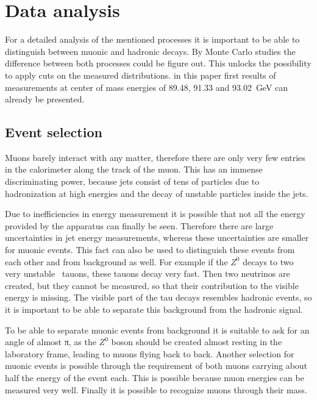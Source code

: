 \documentclass[epj,nopacs]{svjour}
\begin{document}
\section{ Data analysis}

For a detailed analysis of the mentioned processes it is important to be able
to distinguish between muonic and hadronic decays. By Monte Carlo studies the
difference between both processes could be figure out. This unlocks the
possibility to apply cuts on the measured distributions. in this paper first
results of measurements at center of mass energies of \num{89.48}, \num{91.33} and
\SI{93.02}{\giga\electronvolt} can already be presented.

\subsection{ Event selection}
Muons barely interact with any matter, therefore there are only very few
entries in the calorimeter along the track of the muon. This has an immense
discriminating power, because jets consist of tens of particles due to
hadronization at high energies and the decay of unstable particles inside the
jets.

Due to inefficiencies in energy measurement it is possible that not all the
energy provided by the apparatus can finally be seen. Therefore there are large
uncertainties in jet energy measurements, whereas these uncertainties are
smaller for muonic events. This fact can also be used to distinguish these
events from each other and from background as well. For example if the $Z^0$
decays to two very unstable \ tauons, these tauons decay very fast. Then two
neutrinos are created, but they cannot be measured, so that their contribution
to the visible energy is missing. The visible part of the tau decays resembles
hadronic events, so it is important to be able to separate this background from
the hadronic signal.

To be able to separate muonic events from background it is suitable to ask for
an angle of almost π, as the $Z^0$ boson should be created almost resting in
the laboratory frame, leading to muons flying back to back. Another selection
for muonic events is possible through the requirement of both muons carrying
about half the energy of the event each. This is possible because muon energies
can be measured very well. Finally it is possible to recognize muons through
their mass.
\end{document}
